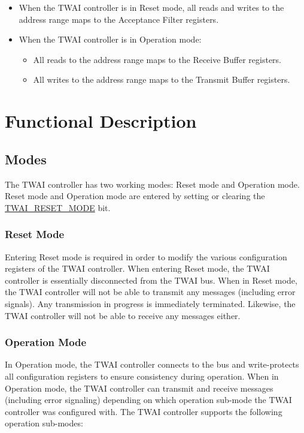 \documentclass[main\_\_EN.tex]{subfiles}
\begin{document}
\begin{itemize}
    \item When the TWAI controller is in Reset mode, all reads and writes to the address range maps to the Acceptance Filter registers.
    \item When the TWAI controller is in Operation mode:
    \begin{itemize}
        \item All reads to the address range maps to the Receive Buffer registers.
        \item All writes to the address range maps to the Transmit Buffer registers.
    \end{itemize}
\end{itemize}


\section{Functional Description}

\subsection{Modes}
\label{sec:twai-modes}
The \chipname{} TWAI controller has two working modes: Reset mode and Operation mode. Reset mode and Operation mode are entered by setting or clearing the \hyperref[fielddesc:TWAIRESETMODE]{TWAI\_RESET\_MODE} bit.

\subsubsection{Reset Mode}
Entering Reset mode is required in order to modify the various configuration registers of the TWAI controller. When entering Reset mode, the TWAI controller is essentially disconnected from the TWAI bus. When in Reset mode, the TWAI controller will not be able to transmit any messages (including error signals). Any transmission in progress is immediately terminated. Likewise, the TWAI controller will not be able to receive any messages either.

\subsubsection{Operation Mode}
In Operation mode, the TWAI controller connects to the bus and write-protects all configuration registers to ensure consistency during operation. When in Operation mode, the TWAI controller can transmit and receive messages (including error signaling) depending on which operation sub-mode the TWAI controller was configured with. The TWAI controller supports the following operation sub-modes:
\end{document}
